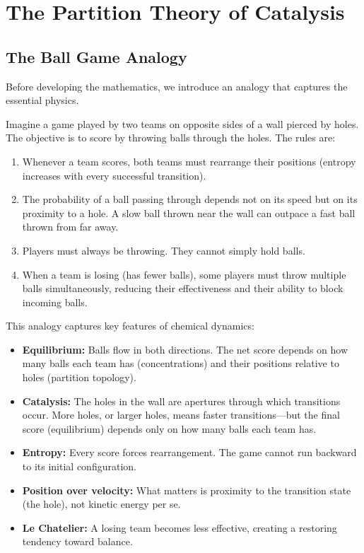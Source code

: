 \documentclass[twocolumn,10pt,a4paper]{article}
\theoremstyle{definition}
\theoremstyle{remark}
\begin{document}
\section{The Partition Theory of Catalysis}
\label{sec:catalysis}

\subsection{The Ball Game Analogy}

Before developing the mathematics, we introduce an analogy that captures the essential physics.

Imagine a game played by two teams on opposite sides of a wall pierced by holes. The objective is to score by throwing balls through the holes. The rules are:

\begin{enumerate}
    \item Whenever a team scores, both teams must rearrange their positions (entropy increases with every successful transition).

    \item The probability of a ball passing through depends not on its speed but on its proximity to a hole. A slow ball thrown near the wall can outpace a fast ball thrown from far away.

    \item Players must always be throwing. They cannot simply hold balls.

    \item When a team is losing (has fewer balls), some players must throw multiple balls simultaneously, reducing their effectiveness and their ability to block incoming balls.
\end{enumerate}

This analogy captures key features of chemical dynamics:

\begin{itemize}
    \item \textbf{Equilibrium:} Balls flow in both directions. The net score depends on how many balls each team has (concentrations) and their positions relative to holes (partition topology).

    \item \textbf{Catalysis:} The holes in the wall are apertures through which transitions occur. More holes, or larger holes, means faster transitions---but the final score (equilibrium) depends only on how many balls each team has.

    \item \textbf{Entropy:} Every score forces rearrangement. The game cannot run backward to its initial configuration.

    \item \textbf{Position over velocity:} What matters is proximity to the transition state (the hole), not kinetic energy per se.

    \item \textbf{Le Chatelier:} A losing team becomes less effective, creating a restoring tendency toward balance.
\end{itemize}
\end{document}
